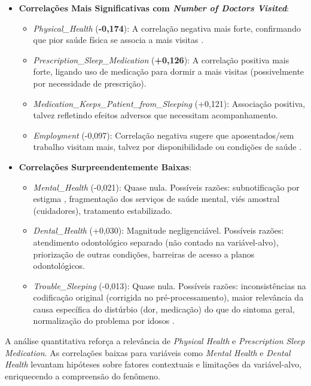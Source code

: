 \documentclass[12pt]{article}
\begin{document}
\begin{itemize}
    \item \textbf{Correlações Mais Significativas com \textit{Number of Doctors Visited}}:
    \begin{itemize}
        \item \textit{Physical\_Health} (\textbf{-0,174}): A correlação negativa mais forte, confirmando que pior saúde física se associa a mais visitas \cite{Maaten2008}.
        \item \textit{Prescription\_Sleep\_Medication} (\textbf{+0,126}): A correlação positiva mais forte, ligando uso de medicação para dormir a mais visitas (possivelmente por necessidade de prescrição).
        \item \textit{Medication\_Keeps\_Patient\_from\_Sleeping} (+0,121): Associação positiva, talvez refletindo efeitos adversos que necessitam acompanhamento.
        \item \textit{Employment} (-0,097): Correlação negativa sugere que aposentados/sem trabalho visitam mais, talvez por disponibilidade ou condições de saúde \cite{Ahs2012}.
    \end{itemize}
    
    \item \textbf{Correlações Surpreendentemente Baixas}:
    \begin{itemize}
        \item \textit{Mental\_Health} (-0,021): Quase nula. Possíveis razões: subnotificação por estigma \cite{GONCALVES2014393}, fragmentação dos serviços de saúde mental, viés amostral (cuidadores), tratamento estabilizado.
        \item \textit{Dental\_Health} (+0,030): Magnitude negligenciável. Possíveis razões: atendimento odontológico separado (não contado na variável-alvo), priorização de outras condições, barreiras de acesso a planos odontológicos.
        \item \textit{Trouble\_Sleeping} (-0,013): Quase nula. Possíveis razões: inconsistências na codificação original (corrigida no pré-processamento), maior relevância da causa específica do distúrbio (dor, medicação) do que do sintoma geral, normalização do problema por idosos \cite{Lindstrom2012}.
    \end{itemize}
\end{itemize}

A análise quantitativa reforça a relevância de \textit{Physical Health} e \textit{Prescription Sleep Medication}. As correlações baixas para variáveis como \textit{Mental Health} e \textit{Dental Health} levantam hipóteses sobre fatores contextuais e limitações da variável-alvo, enriquecendo a compreensão do fenômeno.
\end{document}
